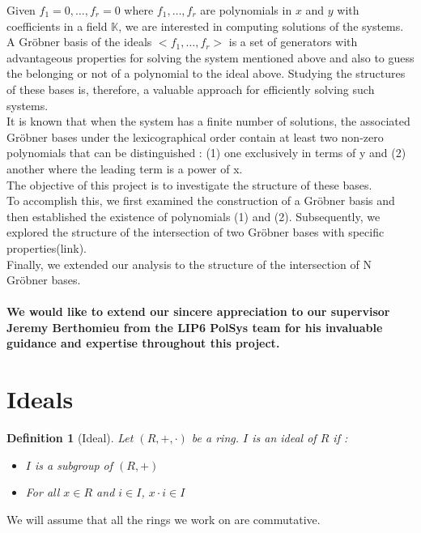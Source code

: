 \documentclass{article}
\newtheorem{definition}{Definition}[section]
\begin{document}
Given $f_{1}=0,\dots,f_{r}=0$ where $f_{1},\dots,f_{r}$ are polynomials in $x$ and $y$ with coefficients in a field $\mathbb{K}$, we are interested in computing solutions of the systems. A Gröbner basis of the ideals $<f_{1},\dots,f_{r}>$ is a set of generators with advantageous properties for solving the system mentioned above and also to guess the belonging or not of a polynomial to the ideal above. Studying the structures of these bases is, therefore, a valuable approach for efficiently solving such systems. \\
It is known that when the system has a finite number of solutions, the associated Gröbner bases under the lexicographical order contain at least two non-zero polynomials that can be distinguished : (1) one exclusively in terms of y and (2) another where the leading term is a power of x. \\
The objective of this project is to investigate the structure of these bases. \\
To accomplish this, we first examined the construction of a Gröbner basis and then established the existence of polynomials (1) and (2). Subsequently, we explored the structure of the intersection of two Gröbner bases with specific properties(link). \\
Finally, we extended our analysis to the structure of the intersection of N Gröbner bases. \\ \\

\textbf{We would like to extend our sincere appreciation to our supervisor Jeremy Berthomieu from the LIP6 PolSys  team for his invaluable guidance and expertise throughout this project.}

\newpage      

\section{Ideals}

\begin{definition}[Ideal]
    Let $(R, +, \cdot)$ be a ring. $I$ is an ideal of $R$ if : 
    \begin{itemize}
        \item $I$ is a subgroup of $(R, +)$
        \item For all $x \in R$ and $i \in I$, $x \cdot i \in I$
    \end{itemize}
\end{definition}

We will assume that all the rings we work on are commutative. 
\end{document}
